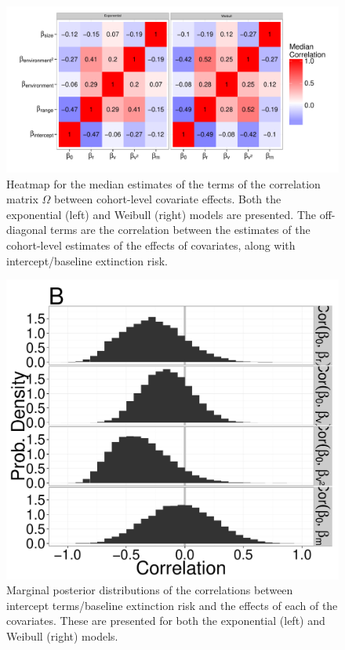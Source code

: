 \documentclass[12pt,letterpaper]{article}
\begin{document}
\begin{figure}[ht]
  \centering
  \includegraphics[height = 0.5\textheight,width=\textwidth,keepaspectratio=true]{figure/correlation_heatmap}
  \caption{Heatmap for the median estimates of the terms of the correlation matrix \(\Omega\) between cohort-level covariate effects. Both the exponential (left) and Weibull (right) models are presented. The off-diagonal terms are the correlation between the estimates of the cohort-level estimates of the effects of covariates, along with intercept/baseline extinction risk.}
  \label{fig:omega}
\end{figure}

\begin{figure}[ht]
  \centering
  \includegraphics[height = 0.5\textheight,width=\textwidth,keepaspectratio=true]{figure/correlation_marginal}
  \caption{Marginal posterior distributions of the correlations between intercept terms/baseline extinction risk and the effects of each of the covariates. These are presented for both the exponential (left) and Weibull (right) models.}
  \label{fig:corr}
\end{figure}
\end{document}
